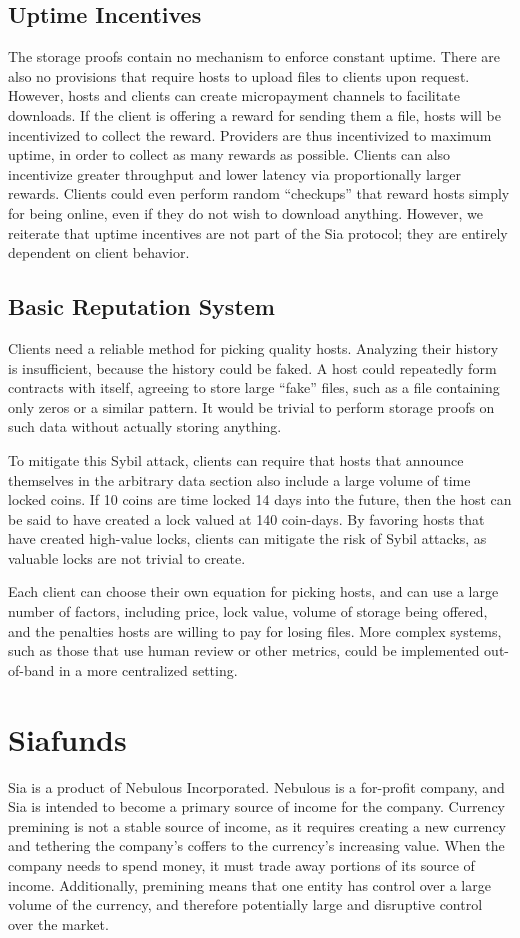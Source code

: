 \documentclass[twocolumn]{article}
\begin{document}
\subsection{Uptime Incentives}
The storage proofs contain no mechanism to enforce constant uptime.
There are also no provisions that require hosts to upload files to clients upon request.
However, hosts and clients can create micropayment channels to facilitate downloads.
If the client is offering a reward for sending them a file, hosts will be incentivized to collect the reward.
Providers are thus incentivized to maximum uptime, in order to collect as many rewards as possible.
Clients can also incentivize greater throughput and lower latency via proportionally larger rewards.
Clients could even perform random ``checkups'' that reward hosts simply for being online, even if they do not wish to download anything.
However, we reiterate that uptime incentives are not part of the Sia protocol; they are entirely dependent on client behavior.

\subsection{Basic Reputation System}
Clients need a reliable method for picking quality hosts.
Analyzing their history is insufficient, because the history could be faked.
A host could repeatedly form contracts with itself, agreeing to store large ``fake'' files, such as a file containing only zeros or a similar pattern.
It would be trivial to perform storage proofs on such data without actually storing anything.

To mitigate this Sybil attack, clients can require that hosts that announce themselves in the arbitrary data section also include a large volume of time locked coins.
If 10 coins are time locked 14 days into the future, then the host can be said to have created a lock valued at 140 coin-days.
By favoring hosts that have created high-value locks, clients can mitigate the risk of Sybil attacks, as valuable locks are not trivial to create.

Each client can choose their own equation for picking hosts, and can use a large number of factors, including price, lock value, volume of storage being offered, and the penalties hosts are willing to pay for losing files.
More complex systems, such as those that use human review or other metrics, could be implemented out-of-band in a more centralized setting.

\section{Siafunds}
Sia is a product of Nebulous Incorporated.
Nebulous is a for-profit company, and Sia is intended to become a primary source of income for the company.
Currency premining is not a stable source of income, as it requires creating a new currency and tethering the company's coffers to the currency's increasing value.
When the company needs to spend money, it must trade away portions of its source of income.
Additionally, premining means that one entity has control over a large volume of the currency, and therefore potentially large and disruptive control over the market.
\end{document}
